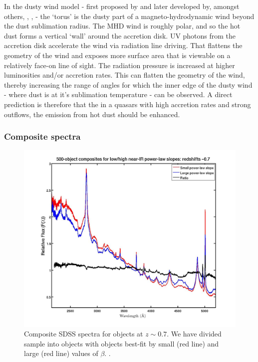 In the dusty wind model - first proposed by \citet{konigl94} and later developed by, amongst others, \citet{everett05}, \citet{elitzur06}, \citet{keating12} - the `torus' is the dusty part of a magneto-hydrodynamic wind beyond the dust sublimation radius. 
The MHD wind is roughly polar, and so the hot dust forms a vertical `wall' around the accretion disk.  
UV photons from the accretion disk accelerate the wind via radiation line driving. 
That flattens the geometry of the wind and exposes more surface area that is viewable on a relatively face-on line of sight.  
The radiation pressure is increased at higher luminosities and/or accretion rates.
This can flatten the geometry of the wind, thereby increasing the range of angles for which the inner edge of the dusty wind - where dust is at it's sublimation temperature - can be observed. 
A direct prediction is therefore that the in a quasars with high accretion rates and strong outflows, the emission from hot dust should be enhanced. 

\subsubsection{Composite spectra}

\begin{figure}
  \centering
  \includegraphics[width=\textwidth]{figures/chapter05/z07_pls_comps.jpg}
  \caption{Composite SDSS spectra for objects at $z\sim0.7$. We have divided sample into objects with objects best-fit by small (red line) and large (red line) values of $\beta$. .}
  \label{fig:pls_comp}
\end{figure}

